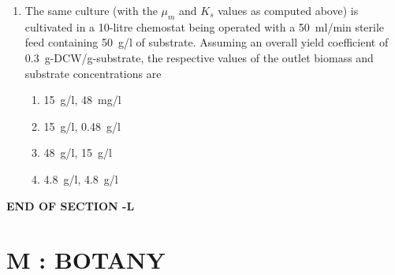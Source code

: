 \documentclass[journal,12pt,onecolumn]{IEEEtran}
\begin{document}
\begin{enumerate}
\begin{multicols}{2}
\begin{enumerate}[label=(\Alph*)]
    \item 0.08, 8
    \item 0.8, 0.8
    \item 0.8, 80
    \item 8, 8
\end{enumerate}
\end{multicols}

\item The same culture (with the $\mu_m$ and $K_s$ values as computed above) is cultivated in a 10-litre chemostat being operated with a 50~ml/min sterile feed containing 50~g/l of substrate. Assuming an overall yield coefficient of 0.3~g-DCW/g-substrate, the respective values of the outlet biomass and substrate concentrations are

\begin{multicols}{2}
\begin{enumerate}[label=(\Alph*)]
    \item 15~g/l, 48~mg/l
    \item 15~g/l, 0.48~g/l
    \item 48~g/l, 15~g/l
    \item 4.8~g/l, 4.8~g/l
\end{enumerate}
\end{multicols}
\end{enumerate}
\begin{center}
    \textbf{END OF SECTION -L}
\end{center}
\newpage
\section*{\centering M : BOTANY}
\end{document}
